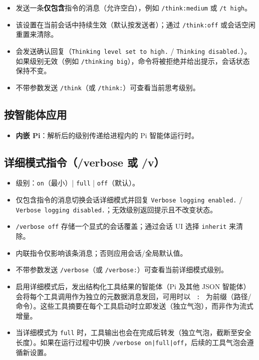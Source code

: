 \begin{itemize}
  \item 发送一条\textbf{仅包含}指令的消息（允许空白），例如 \texttt{/think:medium} 或 \texttt{/t high}。
  \item 该设置在当前会话中持续生效（默认按发送者）；通过 \texttt{/think:off} 或会话空闲重置来清除。
  \item 会发送确认回复（\texttt{Thinking level set to high.} / \texttt{Thinking disabled.}）。如果级别无效（例如 \texttt{/thinking big}），命令将被拒绝并给出提示，会话状态保持不变。
  \item 不带参数发送 \texttt{/think}（或 \texttt{/think:}）可查看当前思考级别。
\end{itemize}


\subsection{按智能体应用}


\begin{itemize}
  \item \textbf{内嵌 Pi}：解析后的级别传递给进程内的 Pi 智能体运行时。
\end{itemize}


\subsection{详细模式指令（/verbose 或 /v）}


\begin{itemize}
  \item 级别：\texttt{on}（最小）| \texttt{full} | \texttt{off}（默认）。
  \item 仅包含指令的消息切换会话详细模式并回复 \texttt{Verbose logging enabled.} / \texttt{Verbose logging disabled.}；无效级别返回提示且不改变状态。
  \item \texttt{/verbose off} 存储一个显式的会话覆盖；通过会话 UI 选择 \texttt{inherit} 来清除。
  \item 内联指令仅影响该条消息；否则应用会话/全局默认值。
  \item 不带参数发送 \texttt{/verbose}（或 \texttt{/verbose:}）可查看当前详细模式级别。
  \item 启用详细模式后，发出结构化工具结果的智能体（Pi 及其他 JSON 智能体）会将每个工具调用作为独立的元数据消息发回，可用时以 \texttt{ : } 为前缀（路径/命令）。这些工具摘要在每个工具启动时立即发送（独立气泡），而非作为流式增量。
  \item 当详细模式为 \texttt{full} 时，工具输出也会在完成后转发（独立气泡，截断至安全长度）。如果在运行过程中切换 \texttt{/verbose on|full|off}，后续的工具气泡会遵循新设置。
\end{itemize}


